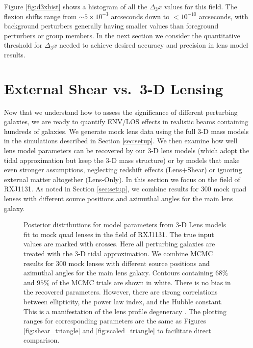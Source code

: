 \documentclass{emulateapj}
\begin{document}
Figure \ref{fig:d3xhist} shows a histogram of all the $\Delta_3 x$ values for this field.  The flexion shifts range from $\sim 5 \times 10^{-3}$ arcseconds down to $<10^{-10}$ arcseconds, with background perturbers generally having smaller values than foreground perturbers or group members.  In the next section we consider the quantitative threshold for $\Delta_3 x$ needed to achieve desired accuracy and precision in lens model results.


\section{External Shear vs.\ 3-D Lensing}
\label{sec:los_vs_shear}

Now that we understand how to assess the significance of different perturbing galaxies, we are ready to quantify ENV/LOS effects in realistic beams containing hundreds of galaxies.  We generate mock lens data using the full 3-D mass models in the simulations described in Section \ref{sec:setup}.  We then examine how well lens model parameters can be recovered by our 3-D lens models (which adopt the tidal approximation but keep the 3-D mass structure) or by models that make even stronger assumptions, neglecting redshift effects (Lens+Shear) or ignoring external matter altogether (Lens-Only).  In this section we focus on the field of RXJ1131.  As noted in Section \ref{sec:setup}, we combine results for 300 mock quad lenses with different source positions and azimuthal angles for the main lens galaxy.

\begin{figure}[t]
\begin{center}
\caption{\label{fig:los_triangle} Posterior distributions for model parameters from 3-D Lens models fit to mock quad lenses in the field of RXJ1131.  The true input values are marked with crosses.  Here all perturbing galaxies are treated with the 3-D tidal approximation.  We combine MCMC results for 300 mock lenses with different source positions and azimuthal angles for the main lens galaxy.  Contours containing $68\%$ and $95\%$ of the MCMC trials are shown in white. There is no bias in the recovered parameters. However, there are strong correlations between ellipticity, the power law index, and the Hubble constant. This is a manifestation of the lens profile degeneracy \citep{Kochanek02}. The plotting ranges for corresponding parameters are the same as Figures \ref{fig:shear_triangle} and \ref{fig:scaled_triangle} to facilitate direct comparison.%
}
\end{center}
\end{figure}
\end{document}

